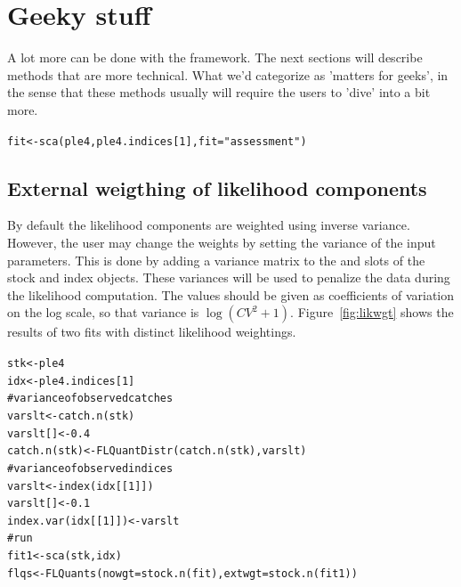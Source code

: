 \documentclass[a4paper,english,10pt]{article}\usepackage[]{graphicx}\usepackage[]{color}
\makeatletter
\newcommand{\hlnum}[1]{\textcolor[rgb]{0.063,0.58,0.627}{#1}}%
\newcommand{\hlstr}[1]{\textcolor[rgb]{0.063,0.58,0.627}{#1}}%
\newcommand{\hlcom}[1]{\textcolor[rgb]{0.588,0.588,0.588}{#1}}%
\newcommand{\hlstd}[1]{\textcolor[rgb]{0.196,0.196,0.196}{#1}}%
\newcommand{\hlkwb}[1]{\textcolor[rgb]{0.627,0,0.314}{#1}}%
\newcommand{\hlkwc}[1]{\textcolor[rgb]{0,0.631,0.314}{#1}}%
\newcommand{\hlkwd}[1]{\textcolor[rgb]{0.78,0.227,0.412}{#1}}%
\newenvironment{kframe}{%
 \def\at@end@of@kframe{}%
 \ifinner\ifhmode%
  \def\at@end@of@kframe{\end{minipage}}%
  \begin{minipage}{\columnwidth}%
 \fi\fi%
 \def\FrameCommand##1{\hskip\@totalleftmargin \hskip-\fboxsep
 \colorbox{shadecolor}{##1}\hskip-\fboxsep
     \hskip-\linewidth \hskip-\@totalleftmargin \hskip\columnwidth}%
 \MakeFramed {\advance\hsize-\width
   \@totalleftmargin\z@ \linewidth\hsize
   \@setminipage}}%
 {\par\unskip\endMakeFramed%
 \at@end@of@kframe}
\newenvironment{knitrout}{}{} %
\makeatother
\begin{document}
\section{Geeky stuff}

A lot more can be done with the \aFa framework. The next sections will describe methods that are more technical. What we'd categorize as 'matters for geeks', in the sense that these methods usually will require the users to 'dive' into  a bit more.

\begin{knitrout}
\color{fgcolor}\begin{kframe}
\begin{alltt}
\hlstd{fit} \hlkwb{<-} \hlkwd{sca}\hlstd{(ple4, ple4.indices[}\hlnum{1}\hlstd{],} \hlkwc{fit} \hlstd{=} \hlstr{"assessment"}\hlstd{)}
\end{alltt}
\end{kframe}
\end{knitrout}

\subsection{External weigthing of likelihood components}

By default the likelihood components are weighted using inverse variance. However, the user may change the weights by setting the variance of the input parameters. This is done by adding a variance matrix to the  and  slots of the stock and index objects. These variances will be used to penalize the data during the likelihood computation. The values should be given as coefficients of variation on the log scale, so that variance is $\log{({CV}^2 + 1)}$. Figure~\ref{fig:likwgt} shows the results of two fits with distinct likelihood weightings.

\begin{knitrout}
\color{fgcolor}\begin{kframe}
\begin{alltt}
\hlstd{stk} \hlkwb{<-} \hlstd{ple4}
\hlstd{idx} \hlkwb{<-} \hlstd{ple4.indices[}\hlnum{1}\hlstd{]}
\hlcom{# variance of observed catches}
\hlstd{varslt} \hlkwb{<-} \hlkwd{catch.n}\hlstd{(stk)}
\hlstd{varslt[]} \hlkwb{<-} \hlnum{0.4}
\hlkwd{catch.n}\hlstd{(stk)} \hlkwb{<-} \hlkwd{FLQuantDistr}\hlstd{(}\hlkwd{catch.n}\hlstd{(stk), varslt)}
\hlcom{# variance of observed indices}
\hlstd{varslt} \hlkwb{<-} \hlkwd{index}\hlstd{(idx[[}\hlnum{1}\hlstd{]])}
\hlstd{varslt[]} \hlkwb{<-} \hlnum{0.1}
\hlkwd{index.var}\hlstd{(idx[[}\hlnum{1}\hlstd{]])} \hlkwb{<-} \hlstd{varslt}
\hlcom{# run}
\hlstd{fit1} \hlkwb{<-} \hlkwd{sca}\hlstd{(stk, idx)}
\hlstd{flqs} \hlkwb{<-} \hlkwd{FLQuants}\hlstd{(}\hlkwc{nowgt} \hlstd{=} \hlkwd{stock.n}\hlstd{(fit),} \hlkwc{extwgt} \hlstd{=} \hlkwd{stock.n}\hlstd{(fit1))}
\end{alltt}
\end{kframe}
\end{knitrout}
\end{document}
